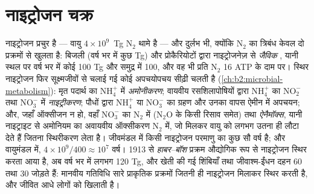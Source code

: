\section{नाइट्रोजन चक्र}

\begin{proposition}[नाइट्रोजन चक्र]\label{prop:b2:biogeochemical-cycles:nitrogen}
नाइट्रोजन प्रचुर है --- वायु $4\times 10^{9}$~Tg $\mathrm{N_2}$
थामे है --- और दुर्लभ भी, क्योंकि $\mathrm{N_2}$ का त्रिबंध
केवल दो प्रक्रमों से खुलता है: बिजली (वर्ष भर में कुछ Tg) और
प्रोकैरियोटों द्वारा नाइट्रोजनेज़ से \emph{जैविक },
यानी स्थल पर वर्ष भर में कोई 100 Tg और समुद्र में 100, और वह भी
प्रति $\mathrm{N_2}$ 16 ATP के दाम पर। स्थिर नाइट्रोजन फिर सूक्ष्मजीवों से
चलाई गई कोई अपचयोपचय सीढ़ी चलती है (\cref{ch:b2:microbial-metabolism}):
मृत पदार्थ का $\mathrm{NH_4^{+}}$ में \emph{अमोनीकरण};
वायवीय रसशिलापोषियों द्वारा $\mathrm{NH_4^{+}}$ का $\mathrm{NO_2^{-}}$ तथा $\mathrm{NO_3^{-}}$ में
\emph{नाइट्रीकरण}; पौधों द्वारा $\mathrm{NH_4^{+}}$ या $\mathrm{NO_3^{-}}$ का ग्रहण
और उनका वापस ऐमीन में अपचयन; और, जहाँ ऑक्सीजन न हो, वहाँ
$\mathrm{NO_3^{-}}$ का $\mathrm{N_2}$ में \emph{} ($\mathrm{N_2O}$ के किसी
रिसाव समेत) तथा \emph{ऐनैमॉक्स}, यानी नाइट्राइट से अमोनियम का
अवायवीय ऑक्सीकरण $\mathrm{N_2}$ में, जो मिलकर वायु को लगभग उतना ही लौटा देते हैं
जितना स्थिरीकरण लेता है। जीवमंडल में किसी नाइट्रोजन परमाणु का
 कुछ सौ वर्ष है; और वायुमंडल में, $4\times
10^{9}/400 \approx 10^{7}$ वर्ष। 1913 से \emph{हाबर--बॉश}
प्रक्रम औद्योगिक रूप से नाइट्रोजन स्थिर करता आया है, अब वर्ष भर में लगभग 120 Tg,
और खेती की गई शिंबियाँ तथा जीवाश्म-ईंधन दहन 60 तथा 30 जोड़ते हैं:
मानवीय गतिविधि सारे प्राकृतिक प्रक्रमों जितनी ही नाइट्रोजन
मिलाकर स्थिर करती है, और जीवित आधे लोगों को खिलाती है।
\end{proposition}

